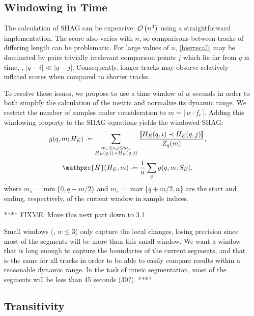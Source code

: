 \documentclass{article}
\def\shag{\ensuremath{\mathpzc{H}}}
\begin{document}

\subsection{Windowing in Time}

The calculation of SHAG can be expensive: $\mathcal{O}\left(n^3\right)$ using a straightforward 
implementation.
The score also varies with $n$, so comparisons between tracks of differing length can
be problematic.  For large values of $n$, \cref{hierrecall} may be dominated by pairs
trivially irrelevant comparison points $j$ which lie far from $q$ in time, \ie, $|q-i| \ll |q-j|$.
Consequently, longer tracks may observe relatively inflated scores when compared to shorter tracks.

To resolve these issues, we propose to use a time window of $w$ seconds in order to both simplify the 
calculation of the metric and normalize its dynamic range.
We restrict the number of samples under consideration to $m = \lceil w \cdot f_r \rceil$.
Adding this windowing property to the SHAG equations yields the windowed SHAG:
\begin{equation}
  g(q, m ; H_E) \defeq \sum_{\substack{
  m_s \leq i,j \leq m_e \\ 
  H_R(q, i) \prec H_R(q, j) }} \frac{\ind{H_E(q, i) \prec H_E(q,
  j)}}{Z_q(m)},\label{windowrecall}
\end{equation}
\begin{equation}
\shag(H_E, m) \defeq \frac{1}{n} \sum_q g(q,m ; S_E),
\end{equation}
where $m_s = \min\{0,q-m/2\}$ and $m_e = \max\{q+m/2,n\}$ are the start and ending, respectively, of the current window in sample indices.

****
FIXME: Move this next part down to 3.1

Small windows (\eg, $w \leq 3$) only capture the local changes, losing precision since most of the segments will be more than this small window.
We want a window that is long enough to capture the boundaries of the current segments, and that is the same for all tracks in order to be able to easily compare results within a reasonable dynamic range.
In the task of music segmentation, most of the segments will be less than 45 seconds (30?).
****

\subsection{Transitivity}
\end{document}
